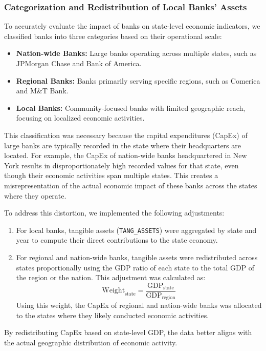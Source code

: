 \documentclass[11pt]{article}
\begin{document}
\subsubsection{Categorization and Redistribution of Local Banks' Assets}

To accurately evaluate the impact of banks on state-level economic indicators, we classified banks into three categories based on their operational scale:
\begin{itemize}
    \item \textbf{Nation-wide Banks:} Large banks operating across multiple states, such as JPMorgan Chase and Bank of America.
    \item \textbf{Regional Banks:} Banks primarily serving specific regions, such as Comerica and M\&T Bank.
    \item \textbf{Local Banks:} Community-focused banks with limited geographic reach, focusing on localized economic activities.
\end{itemize}

This classification was necessary because the capital expenditures (CapEx) of large banks are typically recorded in the state where their headquarters are located. For example, the CapEx of nation-wide banks headquartered in New York results in disproportionately high recorded values for that state, even though their economic activities span multiple states. This creates a misrepresentation of the actual economic impact of these banks across the states where they operate.

To address this distortion, we implemented the following adjustments:
\begin{enumerate}
    \item For local banks, tangible assets (\texttt{TANG\_ASSETS}) were aggregated by state and year to compute their direct contributions to the state economy.
    \item For regional and nation-wide banks, tangible assets were redistributed across states proportionally using the GDP ratio of each state to the total GDP of the region or the nation. This adjustment was calculated as:
    \[
    \text{Weight}_{\text{state}} = \frac{\text{GDP}_{\text{state}}}{\text{GDP}_{\text{region}}}
    \]
    Using this weight, the CapEx of regional and nation-wide banks was allocated to the states where they likely conducted economic activities.
\end{enumerate}

By redistributing CapEx based on state-level GDP, the data better aligns with the actual geographic distribution of economic activity.
\end{document}
